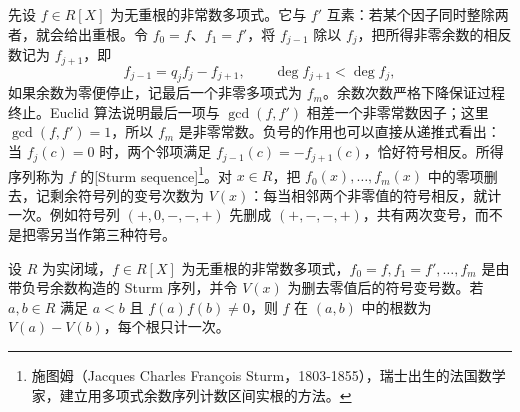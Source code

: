 \ProseParagraphBreak
先设 \(f\in R[X]\) 为无重根的非常数多项式。它与 \(f'\) 互素：若某个因子同时整除两者，就会给出重根。令 \(f_0=f\)、\(f_1=f'\)，将 \(f_{j-1}\) 除以 \(f_j\)，把所得非零余数的相反数记为 \(f_{j+1}\)，即
\begin{equation}\label{b1:eq:sturm-remainders}
	f_{j-1}=q_jf_j-f_{j+1},\qquad \deg f_{j+1}<\deg f_j,
\end{equation}
如果余数为零便停止，记最后一个非零多项式为 \(f_m\)。余数次数严格下降保证过程终止。Euclid 算法说明最后一项与 \(\gcd(f,f')\) 相差一个非零常数因子；这里 \(\gcd(f,f')=1\)，所以 \(f_m\) 是非零常数。负号的作用也可以直接从递推式看出：当 \(f_j(c)=0\) 时，两个邻项满足 \(f_{j-1}(c)=-f_{j+1}(c)\)，恰好符号相反。所得序列称为 \(f\) 的[Sturm sequence]\footnote{施图姆（Jacques Charles François Sturm，1803-1855），瑞士出生的法国数学家，建立用多项式余数序列计数区间实根的方法。}。对 \(x\in R\)，把 \(f_0(x),\ldots,f_m(x)\) 中的零项删去，记剩余符号列的变号次数为 \(V(x)\)：每当相邻两个非零值的符号相反，就计一次。例如符号列 \((+,0,-,-,+)\) 先删成 \((+,-,-,+)\)，共有两次变号，而不是把零另当作第三种符号。

\begin{samepage}
	\begin{theorem}[Sturm]\label{b1:thm:sturm-count}
		设 \(R\) 为实闭域，\(f\in R[X]\) 为无重根的非常数多项式，\(f_0=f,f_1=f',\ldots,f_m\) 是由带负号余数构造的 Sturm 序列，并令 \(V(x)\) 为删去零值后的符号变号数。若 \(a,b\in R\) 满足 \(a<b\) 且 \(f(a)f(b)\neq0\)，则 \(f\) 在 \((a,b)\) 中的根数为 \(V(a)-V(b)\)，每个根只计一次。
	\end{theorem}
\end{samepage}

